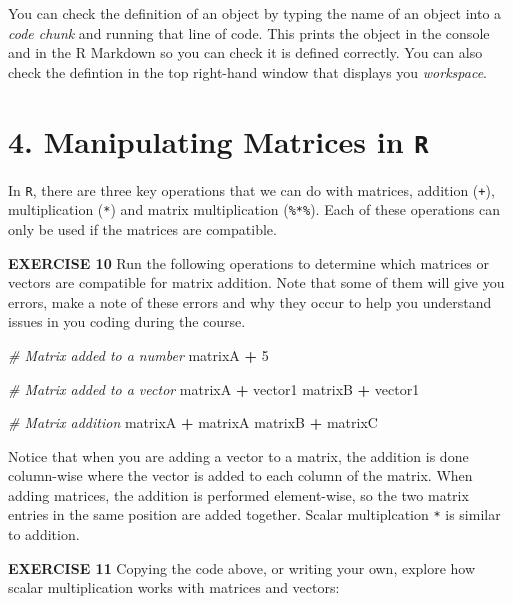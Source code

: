 \documentclass[
]{article}
\newenvironment{Shaded}{\begin{snugshade}}{\end{snugshade}}
\newcommand{\CommentTok}[1]{\textcolor[rgb]{0.56,0.35,0.01}{\textit{#1}}}
\newcommand{\DecValTok}[1]{\textcolor[rgb]{0.00,0.00,0.81}{#1}}
\newcommand{\NormalTok}[1]{#1}
\newcommand{\OperatorTok}[1]{\textcolor[rgb]{0.81,0.36,0.00}{\textbf{#1}}}
\newcommand{\StringTok}[1]{\textcolor[rgb]{0.31,0.60,0.02}{#1}}
\begin{document}
You can check the definition of an object by typing the name of an
object into a \emph{code chunk} and running that line of code. This
prints the object in the console and in the R Markdown so you can check
it is defined correctly. You can also check the defintion in the top
right-hand window that displays you \emph{workspace}.

\hypertarget{manipulating-matrices-in-r}{%
\section{\texorpdfstring{4. Manipulating Matrices in
\texttt{R}}{4. Manipulating Matrices in R}}\label{manipulating-matrices-in-r}}

In \texttt{R}, there are three key operations that we can do with
matrices, addition (\texttt{+}), multiplication (\texttt{*}) and matrix
multiplication (\texttt{\%*\%}). Each of these operations can only be
used if the matrices are compatible.

\textbf{EXERCISE 10} Run the following operations to determine which
matrices or vectors are compatible for matrix addition. Note that some
of them will give you errors, make a note of these errors and why they
occur to help you understand issues in you coding during the course.

\begin{Shaded}
\begin{Highlighting}[]
\CommentTok{# Matrix added to a number}
\NormalTok{matrixA }\OperatorTok{+}\StringTok{ }\DecValTok{5}

\CommentTok{# Matrix added to a vector}
\NormalTok{matrixA }\OperatorTok{+}\StringTok{ }\NormalTok{vector1}
\NormalTok{matrixB }\OperatorTok{+}\StringTok{ }\NormalTok{vector1}

\CommentTok{# Matrix addition}
\NormalTok{matrixA }\OperatorTok{+}\StringTok{ }\NormalTok{matrixA}
\NormalTok{matrixB }\OperatorTok{+}\StringTok{ }\NormalTok{matrixC}
\end{Highlighting}
\end{Shaded}

Notice that when you are adding a vector to a matrix, the addition is
done column-wise where the vector is added to each column of the matrix.
When adding matrices, the addition is performed element-wise, so the two
matrix entries in the same position are added together. Scalar
multiplcation \texttt{*} is similar to addition.

\textbf{EXERCISE 11} Copying the code above, or writing your own,
explore how scalar multiplication works with matrices and vectors:
\end{document}
